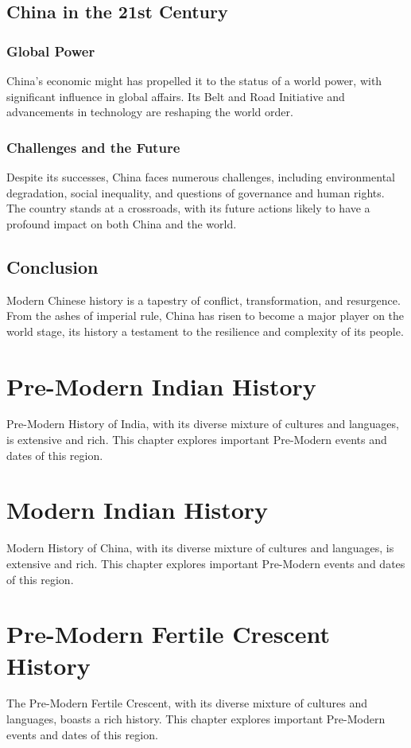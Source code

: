 \documentclass[a4paper,12pt]{book}
\begin{document}
\section{China in the 21st Century}
\label{sec:china-21st-century}
\subsection{Global Power}
China's economic might has propelled it to the status of a world power, with significant influence in global affairs. Its Belt and Road Initiative and advancements in technology are reshaping the world order.

\subsection{Challenges and the Future}
Despite its successes, China faces numerous challenges, including environmental degradation, social inequality, and questions of governance and human rights. The country stands at a crossroads, with its future actions likely to have a profound impact on both China and the world.

\section{Conclusion}
\label{sec:conclusion}
Modern Chinese history is a tapestry of conflict, transformation, and resurgence. From the ashes of imperial rule, China has risen to become a major player on the world stage, its history a testament to the resilience and complexity of its people.


\chapter{Pre-Modern Indian History}
Pre-Modern History of India, with its diverse mixture of cultures and languages, is extensive and rich. This chapter explores important Pre-Modern events and dates of this region.

\chapter{Modern Indian History}
Modern History of China, with its diverse mixture of cultures and languages, is extensive and rich. This chapter explores important Pre-Modern events and dates of this region.

\chapter{Pre-Modern Fertile Crescent History}
The Pre-Modern Fertile Crescent, with its diverse mixture of cultures and languages, boasts a rich history. This chapter explores important Pre-Modern events and dates of this region.
\end{document}
